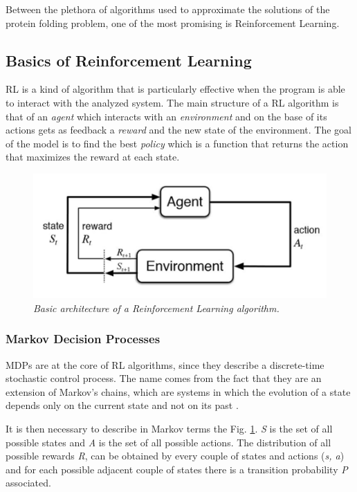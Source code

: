 Between the plethora of algorithms used to approximate the solutions of the protein folding problem, one of the most promising is Reinforcement Learning.

\subsection{Basics of Reinforcement Learning} \label{BRL}

RL is a kind of algorithm that is particularly effective when the program is able to interact with the analyzed system.
The main structure of a RL algorithm is that of an \emph{agent} which interacts with an \emph{environment} and on the base of its actions gets as feedback a \emph{reward} and the new state of the environment.
The goal of the model is to find the best \emph{policy} which is a function that returns the action that maximizes the reward at each state.
\begin{figure}[H]
    \centering
    \includegraphics[width=.75\textwidth]{img/rl0.png}
    \caption{\emph{Basic architecture of a Reinforcement Learning algorithm.}}
    \label{fig:rl0}
\end{figure}

\subsubsection{Markov Decision Processes}
MDPs are at the core of RL algorithms, since they describe a discrete-time stochastic control process.
The name comes from the fact that they are an extension of Markov's chains, which are systems in which the evolution of a state depends only on the current state and not on its past \cite{bellman1957markovian}.

It is then necessary to describe in Markov terms the Fig. \ref{fig:rl0}.
\emph{S} is the set of all possible states and \emph{A} is the set of all possible actions.
The distribution of all possible rewards \emph{R}, can be obtained by every couple of states and actions (\emph{s, a}) and for each possible adjacent couple of states there is a transition probability \emph{P} associated.

